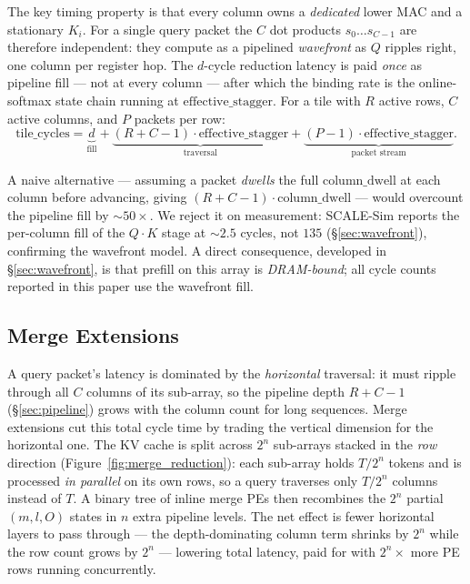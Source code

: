 \documentclass[11pt]{article}
\begin{document}
The key timing property is that every column owns a \emph{dedicated} lower MAC
and a stationary \(K_i\). For a single query packet the \(C\) dot products
\(s_0 \dots s_{C-1}\) are therefore independent: they compute as a pipelined
\emph{wavefront} as \(Q\) ripples right, one column per register hop. The
\(d\)-cycle reduction latency is paid \emph{once} as pipeline fill --- not at
every column --- after which the binding rate is the online-softmax state chain
running at \(\text{effective\_stagger}\). For a tile with \(R\) active rows,
\(C\) active columns, and \(P\) packets per row:
\[
\text{tile\_cycles}
= \underbrace{d}_{\text{fill}}
+ \underbrace{(R + C - 1)\cdot\text{effective\_stagger}}_{\text{traversal}}
+ \underbrace{(P - 1)\cdot\text{effective\_stagger}}_{\text{packet stream}}.
\]

A naive alternative --- assuming a packet \emph{dwells} the full
\(\text{column\_dwell}\) at each column before advancing, giving
\((R + C - 1)\cdot\text{column\_dwell}\) --- would overcount the pipeline fill by
\(\sim\!50\times\). We reject it on measurement: SCALE-Sim reports the per-column
fill of the \(Q\!\cdot\!K\) stage at \(\sim\!2.5\) cycles, not \(135\)
(\S\ref{sec:wavefront}), confirming the wavefront model. A direct consequence,
developed in \S\ref{sec:wavefront}, is that prefill on this array is
\emph{DRAM-bound}; all cycle counts reported in this paper use the wavefront fill.

\subsection{Merge Extensions}

A query packet's latency is dominated by the \emph{horizontal} traversal: it must
ripple through all \(C\) columns of its sub-array, so the pipeline depth
\(R + C - 1\) (\S\ref{sec:pipeline}) grows with the column count for long
sequences. Merge extensions cut this total cycle time by trading the vertical
dimension for the horizontal one. The KV cache is split across \(2^n\)
sub-arrays stacked in the \emph{row} direction
(Figure~\ref{fig:merge_reduction}): each sub-array holds \(T/2^n\) tokens and is
processed \emph{in parallel} on its own rows, so a query traverses only
\(T/2^n\) columns instead of \(T\). A binary tree of inline merge PEs then
recombines the \(2^n\) partial \((m, l, O)\) states in \(n\) extra pipeline
levels. The net effect is fewer horizontal layers to pass through --- the
depth-dominating column term shrinks by \(2^n\) while the row count grows by
\(2^n\) --- lowering total latency, paid for with \(2^n\times\) more PE rows
running concurrently.
\end{document}
